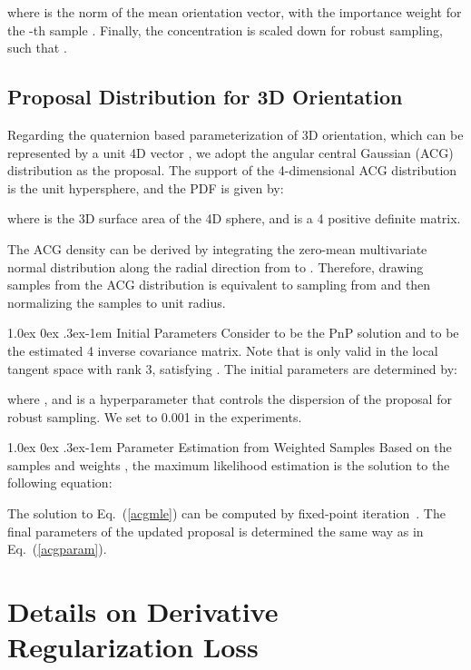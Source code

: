\documentclass[10pt,twocolumn,letterpaper]{article}
\makeatletter
\renewcommand{\paragraph}{
  \@startsection{paragraph}{4}
  {\z@}{1.0ex \@plus 0ex \@minus .3ex}{-1em}
  {\normalfont\normalsize\bfseries}
}
\makeatother
\begin{document}
where  is the norm of the mean orientation vector, with the importance weight  for the -th sample . Finally, the concentration is scaled down for robust sampling, such that .

\subsection{Proposal Distribution for 3D Orientation} Regarding the quaternion based parameterization of 3D orientation, which can be represented by a unit 4D vector , we adopt the angular central Gaussian (ACG) distribution as the proposal. The support of the 4-dimensional ACG distribution is the unit hypersphere, and the PDF is given by:

where  is the 3D surface area of the 4D sphere, and  is a 4 positive definite matrix.

The ACG density can be derived by integrating the zero-mean multivariate normal distribution  along the radial direction from  to . Therefore, drawing samples from the ACG distribution is equivalent to sampling from  and then normalizing the samples to unit radius.

\paragraph{Initial Parameters}
Consider  to be the PnP solution and  to be the estimated 4 inverse covariance matrix. Note that  is only valid in the local tangent space with rank 3, satisfying . The initial parameters are determined by:

where , and  is a hyperparameter that controls the dispersion of the proposal for robust sampling. We set  to 0.001 in the experiments.

\paragraph{Parameter Estimation from Weighted Samples}
Based on the samples  and weights , the maximum likelihood estimation  is the solution to the following equation:

The solution to Eq.~(\ref{acgmle}) can be computed by fixed-point iteration~\cite{ACG}. The final parameters of the updated proposal is determined the same way as in Eq.~(\ref{acgparam}).

\section{Details on Derivative Regularization Loss}
\end{document}
